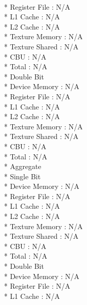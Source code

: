 \documentclass{article}
\begin{document}
     \\*            Register File             : N/A
    \\*             L1 Cache                  : N/A
     \\*            L2 Cache                  : N/A
     \\*            Texture Memory            : N/A
    \\*             Texture Shared            : N/A
     \\*            CBU                       : N/A
      \\*           Total                     : N/A
    \\*         Double Bit            
    \\*             Device Memory             : N/A
     \\*            Register File             : N/A
    \\*             L1 Cache                  : N/A
    \\*             L2 Cache                  : N/A
     \\*            Texture Memory            : N/A
    \\*             Texture Shared            : N/A
    \\*             CBU                       : N/A
   \\*              Total                     : N/A
   \\*      Aggregate
    \\*         Single Bit            
     \\*            Device Memory             : N/A
     \\*            Register File             : N/A
     \\*            L1 Cache                  : N/A
    \\*             L2 Cache                  : N/A
     \\*            Texture Memory            : N/A
    \\*             Texture Shared            : N/A
     \\*            CBU                       : N/A
    \\*             Total                     : N/A
    \\*         Double Bit            
     \\*            Device Memory             : N/A
    \\*             Register File             : N/A
   \\*              L1 Cache                  : N/A
\end{document}
